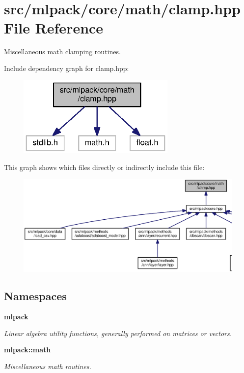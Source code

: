 \section{src/mlpack/core/math/clamp.hpp File Reference}
\label{clamp_8hpp}


Miscellaneous math clamping routines.  


Include dependency graph for clamp.\+hpp\+:
\nopagebreak
\begin{figure}[H]
\begin{center}
\leavevmode
\includegraphics[width=220pt]{clamp_8hpp__incl}
\end{center}
\end{figure}
This graph shows which files directly or indirectly include this file\+:
\nopagebreak
\begin{figure}[H]
\begin{center}
\leavevmode
\includegraphics[width=350pt]{clamp_8hpp__dep__incl}
\end{center}
\end{figure}
\subsection*{Namespaces}
\begin{DoxyCompactItemize}
\item 
 {\bf mlpack}
\begin{DoxyCompactList}\small\item\em Linear algebra utility functions, generally performed on matrices or vectors. \end{DoxyCompactList}\item 
 {\bf mlpack\+::math}
\begin{DoxyCompactList}\small\item\em Miscellaneous math routines. \end{DoxyCompactList}\end{DoxyCompactItemize}
